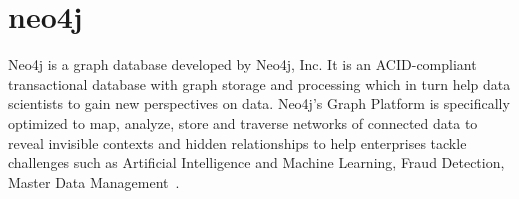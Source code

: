 \section{neo4j}
Neo4j is a graph database developed by Neo4j, Inc. It is an ACID-compliant transactional  database with graph storage and processing which in turn help data scientists to gain new perspectives on data. Neo4j’s Graph Platform is specifically optimized to map, analyze, store and traverse networks of connected data to reveal invisible contexts and hidden relationships to help enterprises tackle challenges such as Artificial Intelligence and Machine Learning, Fraud Detection, Master Data Management~\cite{neo4j}.
